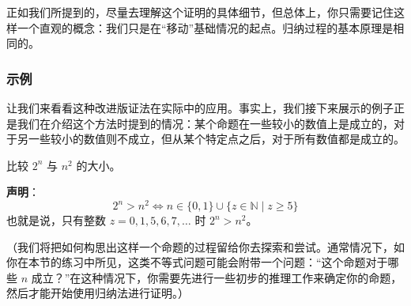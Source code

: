 正如我们所提到的，尽量去理解这个证明的具体细节，但总体上，你只需要记住这样一个直观的概念：我们只是在``移动''基础情况的起点。归纳过程的基本原理是相同的。

\subsubsection*{示例}

让我们来看看这种改进版证法在实际中的应用。事实上，我们接下来展示的例子正是我们在介绍这个方法时提到的情况：某个命题在一些较小的数值上是成立的，对于另一些较小的数值则不成立，但从某个特定点之后，对于所有数值都是成立的。

\begin{example}
    比较 $2^n$ 与 $n^2$ 的大小。

    \textbf{声明}：
    \[2^n > n^2 \iff n \in \{0,1\} \cup \{z \in \mathbb{N} \mid z \ge 5\}\]
    也就是说，只有整数 $z=0,1,5,6,7,\dots$ 时 $2^n > n^2$。
\end{example}

（我们将把如何构思出这样一个命题的过程留给你去探索和尝试。通常情况下，如你在本节的练习中所见，这类不等式问题可能会附带一个问题：``这个命题对于哪些 $n$ 成立？''在这种情况下，你需要先进行一些初步的推理工作来确定你的命题，然后才能开始使用归纳法进行证明。）

